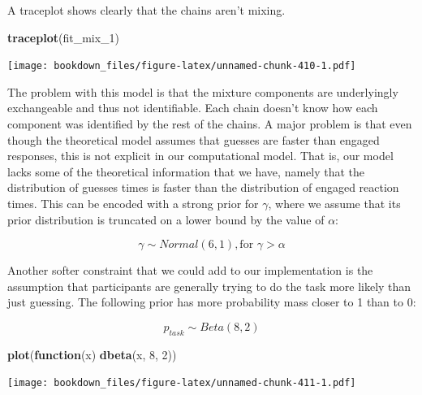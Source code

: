 \documentclass[12pt,]{krantz}
\newenvironment{Shaded}{\begin{snugshade}}{\end{snugshade}}
\newcommand{\ControlFlowTok}[1]{\textcolor[rgb]{0.13,0.29,0.53}{\textbf{#1}}}
\newcommand{\DecValTok}[1]{\textcolor[rgb]{0.00,0.00,0.81}{#1}}
\newcommand{\KeywordTok}[1]{\textcolor[rgb]{0.13,0.29,0.53}{\textbf{#1}}}
\newcommand{\NormalTok}[1]{#1}
\theoremstyle{definition}
\theoremstyle{definition}
\theoremstyle{definition}
\theoremstyle{remark}
\begin{document}
A traceplot shows clearly that the chains aren't mixing.

\begin{Shaded}
\begin{Highlighting}[]
\KeywordTok{traceplot}\NormalTok{(fit_mix_}\DecValTok{1}\NormalTok{) }
\end{Highlighting}
\end{Shaded}

\texttt{[image: bookdown\_files/figure-latex/unnamed-chunk-410-1.pdf]}

The problem with this model is that the mixture components are underlyingly exchangeable and thus not identifiable. Each chain doesn't know how each component was identified by the rest of the chains. A major problem is that even though the theoretical model assumes that guesses are faster than engaged responses, this is not explicit in our computational model. That is, our model lacks some of the theoretical information that we have, namely that the distribution of guesses times is faster than the distribution of engaged reaction times. This can be encoded with a strong prior for \(\gamma\), where we assume that its prior distribution is truncated on a lower bound by the value of \(\alpha\):

\begin{equation}
\gamma \sim Normal(6, 1), \text{for } \gamma > \alpha
\end{equation}

Another softer constraint that we could add to our implementation is the assumption that participants are generally trying to do the task more likely than just guessing. The following prior has more probability mass closer to 1 than to 0:

\begin{equation}
p_{task} \sim Beta(8, 2)
\end{equation}

\begin{Shaded}
\begin{Highlighting}[]
\KeywordTok{plot}\NormalTok{(}\ControlFlowTok{function}\NormalTok{(x) }\KeywordTok{dbeta}\NormalTok{(x, }\DecValTok{8}\NormalTok{, }\DecValTok{2}\NormalTok{))}
\end{Highlighting}
\end{Shaded}

\texttt{[image: bookdown\_files/figure-latex/unnamed-chunk-411-1.pdf]}
\end{document}
